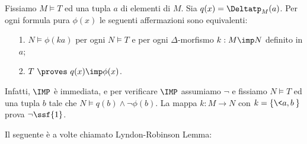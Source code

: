 \begin{remark}\label{oss_pokj}
Fissiamo $M\models T$ ed una tupla $a$ di elementi di $M$. Sia $q(x)=\Deltatp_M(a)$. Per ogni formula pura $\phi(x)$ le seguenti affermazioni sono equivalenti:
\begin{itemize}
\item[1.] $N\models\phi(ka)$ per ogni $N\models T$ e per ogni $\Delta$-morfismo $k:M\imp N$ definito in $a$;
\item[2.] $T\ \proves\  q(x)\imp\phi(x)$.
\end{itemize}
Infatti, $\IMP$ \`e immediata, e per verificare $\IMP$ 
assumiamo $\neg$ e fissiamo $N\models T$ ed una tupla $b$ tale che $N\models q(b)\wedge\neg\phi(b)$. La mappa $k:M\to N$ con $k=\{\<a,b\>\}$ prova $\neg\ssf{1}$.\QED
\end{remark}

Il seguente \`e a volte chiamato Lyndon-Robinson Lemma: 

